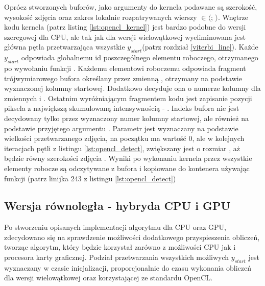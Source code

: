 \documentclass[document.tex]{subfiles}
\begin{document}
\indent Oprócz stworzonych buforów, jako argumenty do kernela podawane są szerokość, wysokość zdjęcia oraz 
zakres lokalnie rozpatrywanych wierszy  $\in \langle$;  $\rangle$.
Wnętrze kodu kernela (patrz listing \ref{lst:opencl_kernel}) jest bardzo podobne do wersji szeregowej
dla CPU, ale tak jak dla wersji wielowątkowej wyeliminowana jest główna pętla przetwarzająca wszystkie
$y_{start}$(patrz rozdział \ref{viterbi_line}). Każde $y_{start}$ odpowiada globalnemu id poszczególnego
elementu roboczego, otrzymanego po wywołaniu funkcji .
Każdemu elementowi roboczemu odpowiada fragment trójwymiarowego bufora  określany przez zmienną
, otrzymany na podstawie wyznaczonej kolumny startowej. Dodatkowo decyduje ona
o numerze kolumny dla zmiennych  i . Ostatnim wyróżniającym fragmentem kodu jest zapisanie
pozycji piksela z największą skumulowaną intensywnością - . Indeks bufora  nie jest
decydowany tylko przez wyznaczony numer kolumny startowej, ale również na podstawie przyjętego argumentu
.
\indent Parametr  jest wyznaczany na podstawie wielkości przetwarzanego zdjęcia,
na początku ma wartość 0, ale w kolejnych iteracjach pętli z listingu \ref{lst:opencl_detect},
zwiększany jest o rozmiar , aż będzie równy szerokości zdjęcia .
Wyniki po wykonaniu kernela przez wszystkie elementy robocze są odczytywane z bufora  i 
kopiowane do kontenera  używając funkcji (patrz linijka 243 z listingu
\ref{lst:opencl_detect})

 

 


\subsection{Wersja równoległa - hybryda CPU i GPU}
\indent Po stworzeniu opisanych implementacji algorytmu dla CPU oraz GPU, zdecydowano się
na sprawdzenie możliwości dodatkowego przyspieszenia obliczeń, tworząc algorytm, który będzie
korzystał zarówno z możliwości CPU jak i procesora karty graficznej. Podział przetwarzania
wszystkich możliwych $y_{start}$ jest wyznaczany w czasie inicjalizacji, proporcjonalnie do czasu
wykonania obliczeń dla wersji wielowątkowej oraz korzystającej ze standardu OpenCL. 

\end{document}
